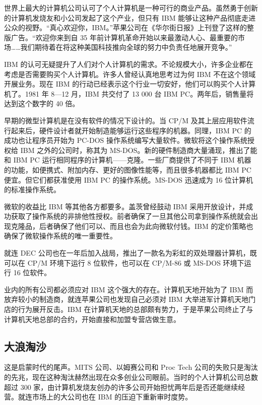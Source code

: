 \documentclass[12pt,UTF8]{ctexbook}
\begin{document}
世界上最大的计算机公司认可了个人计算机是一种可行的商业产品。虽然勇于创新的计算机发烧友和小公司发起了这个产业，但只有 IBM 能够让这种产品彻底走进公众的视野。“真心欢迎你，IBM。”苹果公司在《华尔街日报》上刊登了这样的整版广告。“欢迎你来到自 35 年前计算机革命开始以来最激动人心、最重要的市场……我们期待着在将这种美国科技推向全球的努力中负责任地展开竞争。”

IBM 的认可无疑提升了人们对个人计算机的需求。不论规模大小，许多企业都在考虑是否需要购买个人计算机。许多人曾经认真地思考过为何 IBM 不在这个领域开展业务。现在 IBM 的行动已经表示这个行业一切安好，他们可以购买个人计算机了。1981 年 8—12 月，IBM 共交付了 13 000 台 IBM PC。两年后，销售量将达到这个数字的 40 倍。

早期的微型计算机是在没有软件的情况下设计的。当 CP/M 及其上层应用软件流行起来后，硬件设计者就开始制造能够运行这些程序的机器。同理，IBM PC 的成功也让程序员开始为 PC-DOS 操作系统编写大量软件。微软将这个操作系统授权给 IBM 之外的公司时，称其为 MS-DOS。新的硬件制造商大量涌现，推出了能和 IBM PC 运行相同程序的计算机——克隆。一些厂商提供了不同于 IBM 机器的功能，如便携式、附加内存、更好的图像性能等，而且很多机器都比 IBM PC 便宜。但它们都获准使用 IBM PC 的操作系统。MS-DOS 迅速成为 16 位计算机的标准操作系统。

微软的收益比 IBM 等其他各方都要多。盖茨曾经鼓动 IBM 采用开放设计，并成功获取了操作系统的非排他性授权。前者确保了一旦其他公司拿到操作系统就会出现克隆品，后者确保了他们可以、而且也会为此向微软付钱。IBM 的定价策略也确保了微软操作系统的唯一重要性。

就连 DEC 公司也在一年后加入战局，推出了一款名为彩虹的双处理器计算机，既可以在 CP/M 环境下运行 8 位软件，也可以在 CP/M-86 或 MS-DOS 环境下运行 16 位软件。

业内的所有公司都必须应对 IBM 这个强大的存在。计算机天地开始为了 IBM 而放弃较小的制造商，就连苹果公司也发现自己必须对 IBM 大举进军计算机天地门店的行为展开反击。IBM 在计算机天地的总部颇有势力，于是苹果公司终止了与计算机天地总部的合约，开始直接和加盟专营店做生意。





\subsection{大浪淘沙}


这是启蒙时代的尾声。MITS 公司、以姆赛公司和 Proc Tech 公司的失败只是淘汰的先兆，现在这种淘汰赫然出现在众多创业公司眼前。当时的个人计算机公司总数超过 300 家，由计算机发烧友创办的许多公司开始担忧两年后是否还能继续经营。就连市场上的大公司也在 IBM 的压迫下重新审时度势。
\end{document}
